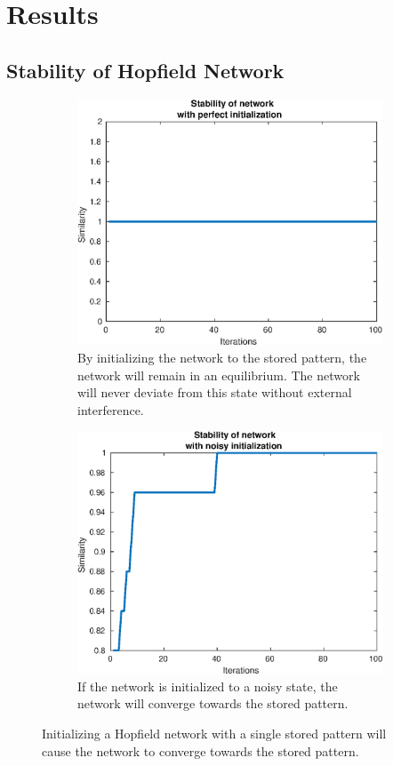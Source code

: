 \section{Results}

\subsection{Stability of Hopfield Network}
\begin{figure}[H]
    \centering
    \begin{subfigure}{0.49\textwidth}
        \includegraphics[width=\textwidth]{figs/stable}
        \caption{By initializing the network to the stored pattern, the network will remain in an equilibrium. The network will never deviate from this state without external interference.}
    \end{subfigure}
    \begin{subfigure}{0.49\textwidth}
        \includegraphics[width=\textwidth]{figs/stable-with-noise}
        \caption{If the network is initialized to a noisy state, the network will converge towards the stored pattern. }
    \end{subfigure}
    \caption{Initializing a Hopfield network with a single stored pattern will cause the network to converge towards the stored pattern.}
\end{figure}
